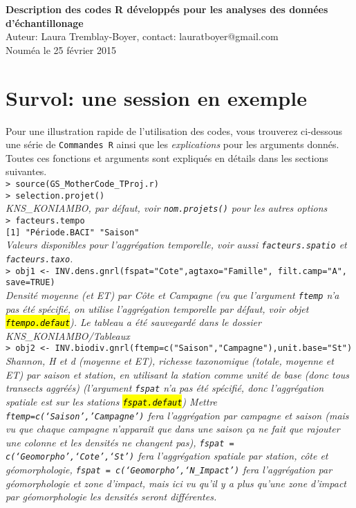 \documentclass{article}
\begin{document}
{\Large \textbf{Description des codes R développés pour les analyses
    des données d'échantillonage}}\\
Auteur: Laura Tremblay-Boyer, contact: lauratboyer@gmail.com\\
Nouméa le 25 février 2015\\



\section{Survol: une session en exemple}
Pour une illustration rapide de l'utilisation des codes, vous
trouverez ci-dessous une série de \texttt{Commandes R} ainsi que les
\emph{explications} pour les arguments donnés. Toutes ces fonctions et
arguments sont expliqués en détails dans les sections suivantes.\\

\texttt{> source(GS\_MotherCode\_TProj.r)} \\

\texttt{> selection.projet()}\\
\emph{KNS\_KONIAMBO, par défaut, voir \texttt{nom.projets()} pour les autres options}\\

\texttt{> facteurs.tempo}\\
\texttt{[1] "Période.BACI" "Saison"}\\
\emph{Valeurs disponibles pour l'aggrégation temporelle, voir aussi \texttt{facteurs.spatio} et \texttt{facteurs.taxo}.}\\


\texttt{> obj1 <- INV.dens.gnrl(fspat="Cote",agtaxo="Famille",
  filt.camp="A", save=TRUE)}\\
\emph{Densité moyenne (et ET) par Côte et Campagne (vu que l'argument
\texttt{ftemp} n'a pas été spécifié, on utilise l'aggrégation
temporelle par défaut, voir objet \hl{\texttt{ftempo.defaut}}). Le
tableau a été sauvegardé dans le dossier KNS\_KONIAMBO/Tableaux}\\

\texttt{> obj2 <- INV.biodiv.gnrl(ftemp=c("Saison","Campagne"),unit.base="St")}\\
\emph{Shannon, H et d (moyenne et ET), richesse taxonomique (totale, moyenne
et ET) par saison et station, en utilisant la station comme unité de
base (donc tous transects aggréés)  (l'argument
\texttt{fspat} n'a pas été spécifié, donc l'aggrégation spatiale est
sur les stations \hl{\texttt{fspat.defaut}})
Mettre \texttt{ftemp=c(`Saison','Campagne')} fera l'aggrégation par
campagne et saison (mais vu que chaque campagne n'apparaît que dans
une saison ça ne fait que rajouter une colonne et les densités ne
changent pas), \texttt{fspat =
  c(`Geomorpho',`Cote',`St')} fera l'aggrégation spatiale par
station, côte et géomorphologie, \texttt{fspat =
  c(`Geomorpho',`N\_Impact')} fera l'aggrégation par géomorphologie et
zone d'impact, mais ici vu qu'il y a plus qu'une zone d'impact par
géomorphologie les densités seront différentes.}
\end{document}
